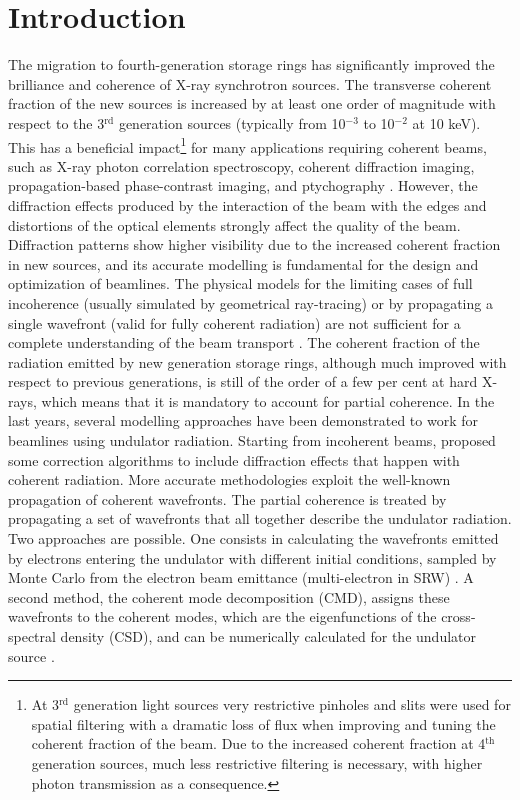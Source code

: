 \documentclass{iucr}
\begin{document}
\section{Introduction}
\label{sec:introduction}

The migration to fourth-generation storage rings has significantly improved the brilliance and coherence of X-ray synchrotron sources. The transverse coherent fraction of the new sources is increased by at least one order of magnitude with respect to the 3$^{\text{rd}}$ generation sources (typically from 10$^{-3}$ to 10$^{-2}$ at 10 keV). This has a beneficial impact\footnote{At 3$^{\text{rd}}$ generation light sources very restrictive pinholes and slits were used for spatial filtering with a dramatic loss of flux when improving and tuning the coherent fraction of the beam. Due to the increased coherent fraction at 4$^{\text{th}}$ generation sources, much less restrictive filtering is necessary, with higher photon transmission as a consequence.} for many applications requiring coherent beams, such as X-ray photon correlation spectroscopy, coherent diffraction imaging, propagation-based phase-contrast imaging, and ptychography \cite{paganin_book}.
However, the diffraction effects produced by the interaction of the beam with the edges and distortions of the optical elements strongly affect the quality of the beam. Diffraction patterns show higher visibility due to the increased coherent fraction in new sources, and its accurate modelling is fundamental for the design and optimization of beamlines. The physical models for the limiting cases of full incoherence (usually simulated by geometrical ray-tracing) or by propagating a single wavefront (valid for fully coherent radiation) are not sufficient for a complete understanding of the beam transport \cite{hierarchical}. The coherent fraction of the radiation emitted by new generation storage rings, although much improved with respect to previous generations, is still of the order of a few per cent at hard X-rays, which means that it is mandatory to account for partial coherence. In the last years, several modelling approaches have been demonstrated to work for beamlines using undulator radiation. Starting from incoherent beams,  proposed some correction algorithms to include diffraction effects that happen with coherent radiation. More accurate methodologies exploit the well-known propagation of coherent wavefronts. The partial coherence is treated by propagating a set of wavefronts that all together describe the undulator radiation. Two approaches are possible. One consists in calculating the wavefronts emitted by electrons entering the undulator with different initial conditions, sampled by Monte Carlo from the electron beam emittance (multi-electron in SRW) \cite{codeSRW_ME}. A second method, the coherent mode decomposition (CMD), assigns these wavefronts to the coherent modes, which are the eigenfunctions of the cross-spectral density (CSD), and can be numerically calculated for the undulator source \cite{glass2017}.  
\end{document}
